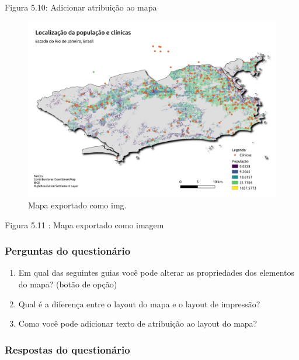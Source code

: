 \documentclass[
]{book}
\providecommand{\tightlist}{%
  \setlength{\itemsep}{0pt}\setlength{\parskip}{0pt}}
\begin{document}
Figura 5.10: Adicionar atribuição ao mapa

\begin{figure}
\centering
\includegraphics{media/modulo5/exported-map.png}
\caption{Mapa exportado como img.}
\end{figure}

Figura 5.11 : Mapa exportado como imagem

\hypertarget{perguntas-do-questionuxe1rio-12}{%
\subsubsection{\texorpdfstring{\textbf{Perguntas do questionário}}{Perguntas do questionário}}\label{perguntas-do-questionuxe1rio-12}}

\begin{enumerate}
\def\labelenumi{\arabic{enumi}.}
\tightlist
\item
  Em qual das seguintes guias você pode alterar as propriedades dos elementos do mapa? (botão de opção)
\item
  Qual é a diferença entre o layout do mapa e o layout de impressão?
\item
  Como você pode adicionar texto de atribuição ao layout do mapa?
\end{enumerate}

\hypertarget{respostas-do-questionuxe1rio-3}{%
\subsubsection{\texorpdfstring{\textbf{Respostas do questionário }}{Respostas do questionário }}\label{respostas-do-questionuxe1rio-3}}
\end{document}
